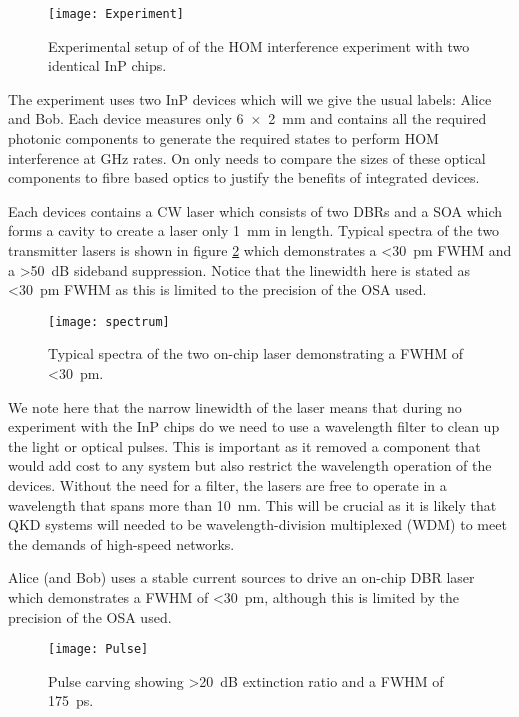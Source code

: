 \begin{figure}[tbp]
	\centering
	\texttt{[image: Experiment]}
	\caption[HOM experimental setup]{Experimental setup of of the \ac{HOM} interference experiment with two identical \ac{InP} chips.}
	\label{fig:hom_experiment}
\end{figure}

The experiment uses two \ac{InP} devices which will we give the usual labels: Alice and Bob. Each device measures only \SI[product-units=power]{6x2}{mm} and contains all the required photonic components to generate the required states to perform \ac{HOM} interference at GHz rates. On only needs to compare the sizes of these optical components to fibre based optics to justify the benefits of integrated devices.

Each devices contains a \ac{CW} laser which consists of two \acp{DBR} and a \ac{SOA} which forms a cavity to create a laser only \SI{1}{mm} in length. Typical spectra of the two transmitter lasers is shown in figure \ref{fig:spectra} which demonstrates a \SI{<30}{pm} \ac{FWHM} and a \SI{>50}{dB} sideband suppression. Notice that the linewidth here is stated as \SI{<30}{pm} \ac{FWHM} as this is limited to the precision of the \ac{OSA} used. 

\begin{figure}[tbp]
	\centering
	\texttt{[image: spectrum]}
	\caption[Laser spectrum]{Typical spectra of the two on-chip laser demonstrating a \ac{FWHM} of \SI{<30}{pm}.}
	\label{fig:spectra}
\end{figure}

We note here that the narrow linewidth of the laser means that during no experiment with the \ac{InP} chips do we need to use a wavelength filter to clean up the light or optical pulses. This is important as it removed a component that would add cost to any system but also restrict the wavelength operation of the devices. Without the need for a filter, the lasers are free to operate in a wavelength that spans more than \SI{10}{nm}. This will be crucial as it is likely that \ac{QKD} systems will needed to be wavelength-division multiplexed (WDM) to meet the demands of high-speed networks.

Alice (and Bob) uses a stable current sources to drive an on-chip \ac{DBR} laser which demonstrates a \ac{FWHM} of \SI{<30}{pm}, although this is limited by the precision of the \ac{OSA} used.

\begin{figure}[tbp]
	\centering
	\texttt{[image: Pulse]}
	\caption[Pulse carving]{Pulse carving showing \SI{>20}{dB} extinction ratio and a \ac{FWHM} of \SI{175}{\pico\second}.}
	\label{fig:pulses}
\end{figure}

